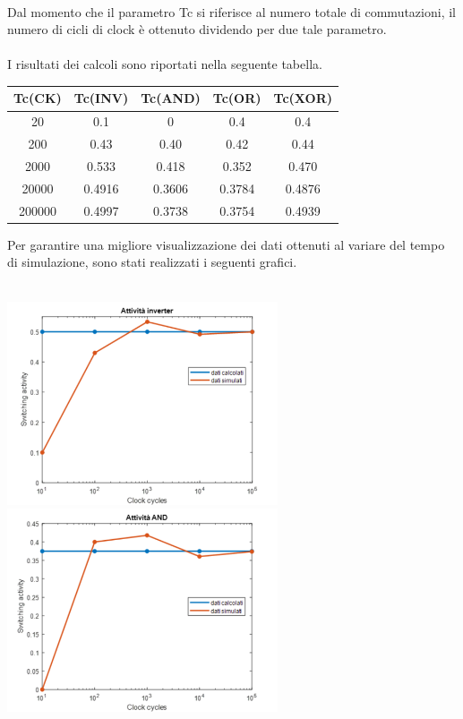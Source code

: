 \documentclass[11pt,  english, makeidx, a4paper, titlepage, oneside]{book}
\begin{document}
\\
Dal momento che il parametro Tc si riferisce al numero totale di 
commutazioni, il numero di cicli di clock è ottenuto dividendo per due
tale parametro.
\\\\
I risultati dei calcoli sono riportati nella seguente tabella. 
\\
\begin{center}
	\begin{tabular}{|c|c|c|c|c|}
	\hline
	Tc(CK) & Tc(INV) & Tc(AND) & Tc(OR) & Tc(XOR) \\ 
	\hline
	20 & 0.1 & 0 & 0.4 & 0.4 \\
	\hline
	200 & 0.43 & 0.40 & 0.42 & 0.44 \\
	\hline
	2000 & 0.533 & 0.418 & 0.352 & 0.470 \\
	\hline
	20000 & 0.4916 & 0.3606 & 0.3784 & 0.4876 \\
	\hline
	200000 & 0.4997 & 0.3738 & 0.3754 & 0.4939 \\
	\hline
	\end{tabular}
\end{center}
\vspace{1cm}
Per garantire una migliore visualizzazione dei dati ottenuti 
al variare del tempo di simulazione, sono stati realizzati 
i seguenti grafici.
\\\\
\centerline{\includegraphics[width=8cm]{./img/Lab_1/Es_1/Inverter.png}
            \includegraphics[width=8cm]{./img/Lab_1/Es_1/AND.png}}
\newpage
\end{document}
